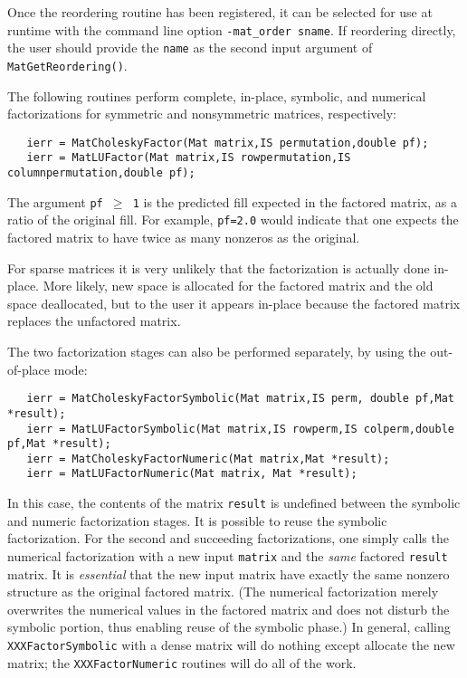 Once the reordering routine has been registered,
it can be selected for use at runtime with the
command line option {\tt -mat\_order sname}.  If reordering directly,
the user should provide the {\tt name} as the second input argument of
{\tt MatGetReordering()}.

The following routines perform complete, in-place, symbolic, and numerical 
factorizations for symmetric and nonsymmetric matrices, respectively:
\begin{verbatim}
   ierr = MatCholeskyFactor(Mat matrix,IS permutation,double pf);
   ierr = MatLUFactor(Mat matrix,IS rowpermutation,IS columnpermutation,double pf); 
\end{verbatim}
The argument {\tt pf $ \ge $ 1} is the predicted fill
expected in the factored matrix, as a ratio of the original fill. 
For example, {\tt pf=2.0} would indicate that one expects the factored
matrix to have twice as many nonzeros as the original.
 

For sparse matrices it is very unlikely that the factorization 
is actually done in-place. More likely, new space is allocated 
for the factored matrix and the old space deallocated, but to the 
user it appears in-place because the factored matrix replaces
the unfactored matrix.

The 
two  
factorization 
stages  
can also be performed separately, by using the out-of-place mode:
\begin{verbatim}
   ierr = MatCholeskyFactorSymbolic(Mat matrix,IS perm, double pf,Mat *result);
   ierr = MatLUFactorSymbolic(Mat matrix,IS rowperm,IS colperm,double pf,Mat *result);
   ierr = MatCholeskyFactorNumeric(Mat matrix,Mat *result);
   ierr = MatLUFactorNumeric(Mat matrix, Mat *result);
\end{verbatim}
In this case, the contents of the matrix {\tt result} is undefined between 
the symbolic and numeric factorization stages. 
It is possible to reuse the symbolic factorization. For the second and 
succeeding factorizations, one simply calls the numerical factorization with a 
new input {\tt matrix} and the {\em same} factored {\tt result} matrix.
It is {\em essential} that the new input matrix 
have   %
exactly the same nonzero structure as the original factored matrix.
(The numerical factorization merely overwrites the numerical values in the 
factored matrix and does not disturb the symbolic portion, thus enabling
reuse of the symbolic phase.)
In general, calling {\tt XXXFactorSymbolic} with a dense matrix will 
do nothing except allocate the new matrix; the {\tt XXXFactorNumeric} 
routines will do all of the work. 

